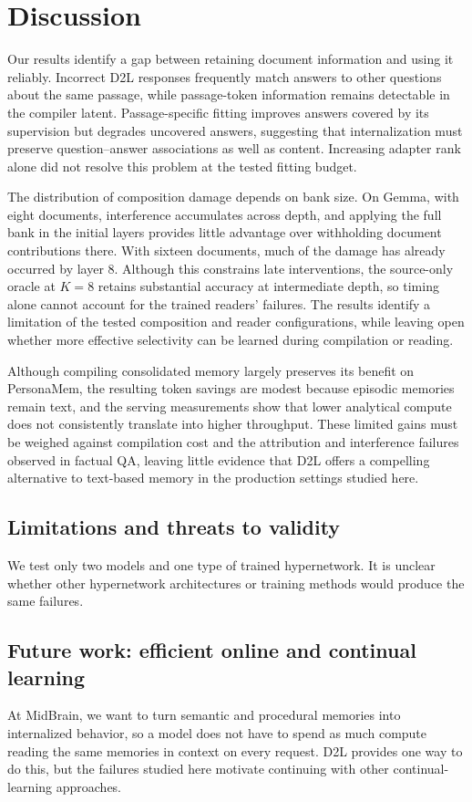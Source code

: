 \section{Discussion}
\label{sec:discussion}

Our results identify a gap between retaining document information and using it
reliably. Incorrect D2L responses frequently match answers to other questions
about the same passage, while passage-token information remains detectable in
the compiler latent. Passage-specific fitting improves answers covered by its
supervision but degrades uncovered answers, suggesting that internalization
must preserve question--answer associations as well as content. Increasing
adapter rank alone did not resolve this problem at the tested fitting budget.

The distribution of composition damage depends on bank size. On Gemma, with eight
documents, interference accumulates across depth, and applying the full bank
in the initial layers provides little advantage over withholding document
contributions there. With sixteen documents, much of the damage has already
occurred by layer 8. Although this constrains late interventions, the
source-only oracle at $K=8$ retains substantial accuracy at intermediate depth,
so timing alone cannot account for the trained readers' failures.
The results identify a limitation of the tested composition and reader
configurations, while leaving open whether more effective selectivity can
be learned during compilation or reading.

Although compiling consolidated memory largely preserves its benefit on
PersonaMem, the resulting token savings are modest because episodic memories
remain text, and the serving measurements show that lower analytical compute
does not consistently translate into higher throughput. These limited gains
must be weighed against compilation cost and the attribution and interference
failures observed in factual QA, leaving little evidence that D2L offers a
compelling alternative to text-based memory in the production settings studied
here.

\subsection{Limitations and threats to validity}
We test only two models and one type of trained hypernetwork. It is unclear
whether other hypernetwork architectures or training methods would produce
the same failures.

\subsection{Future work: efficient online and continual learning}
At MidBrain, we want to turn semantic and procedural memories into internalized
behavior, so a model does not have to spend as much compute reading the same
memories in context on every request. D2L provides one way to do this, but the
failures studied here motivate continuing with other continual-learning
approaches.

